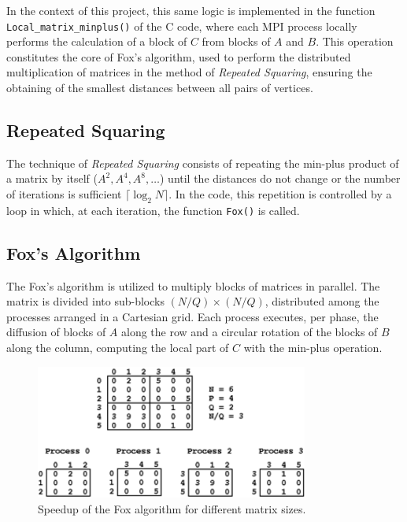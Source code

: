 \documentclass[10pt,a4paper]{article}
\begin{document}
In the context of this project, this same logic is implemented in the function
\texttt{Local\_matrix\_minplus()} of the C code, where each MPI process
locally performs the calculation of a block of \( C \) from blocks of
\( A \) and \( B \). This operation constitutes the core of Fox's algorithm,
used to perform the distributed multiplication of matrices in the method of
\emph{Repeated Squaring}, ensuring the obtaining of the smallest distances between
all pairs of vertices.

\subsection{Repeated Squaring}
The technique of \emph{Repeated Squaring} consists of repeating the min-plus product of a matrix by itself (\(A^2, A^4, A^8, \ldots\)) until the distances do not change or the number of iterations is sufficient \(\bigl\lceil \log_{2} N \bigr\rceil\). In the code, this repetition is controlled by a loop in which, at each iteration, the function \texttt{Fox()} is called.

\subsection{Fox's Algorithm}
The Fox's algorithm is utilized to multiply blocks of matrices in parallel. The matrix is divided into sub-blocks \((N/Q) \times (N/Q)\), distributed among the processes arranged in a Cartesian grid. Each process executes, per phase, the diffusion of blocks of \(A\) along the row and a circular rotation of the blocks of \(B\) along the column, computing the local part of \(C\) with the min-plus operation.

\begin{figure}[H]
  \centering
  \includegraphics[width=0.8\textwidth]{matrix_foxImage.png}
  \caption{Speedup of the Fox algorithm for different matrix sizes.}
  \label{fig:speedup}
\end{figure}
\end{document}
